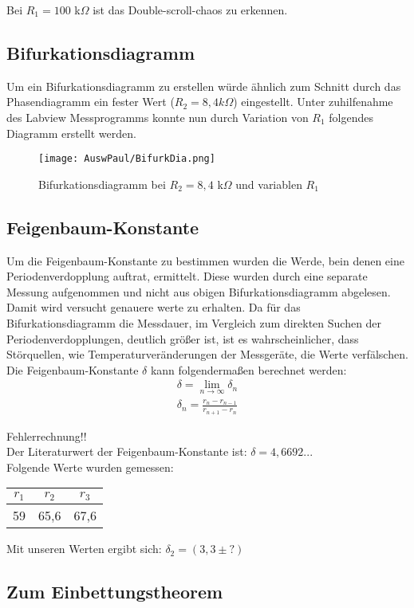Bei $R_1 = 100$ k$\Omega$ ist das Double-scroll-chaos zu erkennen.
\newpage
\subsection{Bifurkationsdiagramm}
Um ein Bifurkationsdiagramm zu erstellen würde ähnlich zum Schnitt durch das Phasendiagramm ein fester Wert (\(R_2=8,4k \Omega\)) eingestellt. Unter zuhilfenahme des Labview Messprogramms konnte nun durch Variation von \(R_1\) folgendes Diagramm erstellt werden.

\begin{figure}[h]
    \centering
    \texttt{[image: AuswPaul/BifurkDia.png]}
    \caption{Bifurkationsdiagramm bei $R_2 = 8,4$ k$\Omega$ und variablen $R_1$}
\end{figure}



\subsection{Feigenbaum-Konstante}

Um die Feigenbaum-Konstante zu bestimmen wurden die Werde, bein denen eine Periodenverdopplung auftrat, ermittelt. Diese wurden durch eine separate Messung aufgenommen und nicht aus obigen Bifurkationsdiagramm abgelesen. Damit wird versucht genauere werte zu erhalten. Da für das Bifurkationsdiagramm die Messdauer, im Vergleich zum direkten Suchen der Periodenverdopplungen, deutlich größer ist, ist es wahrscheinlicher, dass Störquellen, wie Temperaturveränderungen der Messgeräte, die Werte verfälschen.\\

Die Feigenbaum-Konstante \(\delta\) kann folgendermaßen berechnet werden: 
\begin{align}
    \delta = \lim_{n \to \infty} \delta_n \\
    \delta_n = \frac{r_n - r_{n-1}}{r_{n+1} -r_n}
\end{align}

Fehlerrechnung!!\\

Der Literaturwert der Feigenbaum-Konstante ist: \(\delta = 4,6692...\)\\

Folgende Werte wurden gemessen: \\
\begin{tabular}{c c c}
    $r_1$ & $r_2$ & $r_3$\\
    \hline
    59 & 65,6 & 67,6
\end{tabular}

Mit unseren Werten ergibt sich: \(\delta_2 = (3,3 \pm ?)\)

\subsection{Zum Einbettungstheorem}